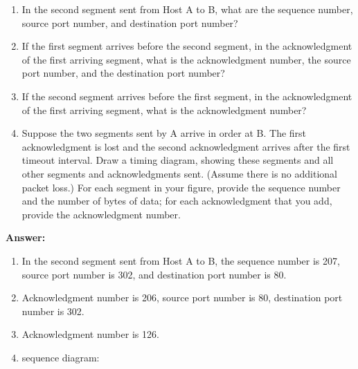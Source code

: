 \begin{enumerate}
\begin{enumerate}
        \item In the second segment sent from Host A to B, what are the sequence number, source port number, and destination port number?
        
        \item If the first segment arrives before the second segment, in the acknowledgment of the first arriving segment, what is the acknowledgment number, the source port number, and the destination port number?
        
        \item If the second segment arrives before the first segment, in the acknowledgment of the first arriving segment, what is the acknowledgment number?
        
        \item Suppose the two segments sent by A arrive in order at B. The first acknowledgment is lost and the second acknowledgment arrives after the first timeout interval. Draw a timing diagram, showing these segments and all other segments and acknowledgments sent. (Assume there is no additional packet loss.) For each segment in your figure, provide the sequence number and the number of bytes of data; for each acknowledgment that you add, provide the acknowledgment number.
    \end{enumerate}

    \textbf{Answer: }

    \begin{enumerate}
        \item In the second segment sent from Host A to B, the sequence number is 207, source port number is 302, and destination port number is 80.
        \item Acknowledgment number is 206, source port number is 80, destination port number is 302.
        \item Acknowledgment number is 126.
        \item sequence diagram:
        
        \begin{center}
\end{center}
\end{enumerate}
\end{enumerate}
